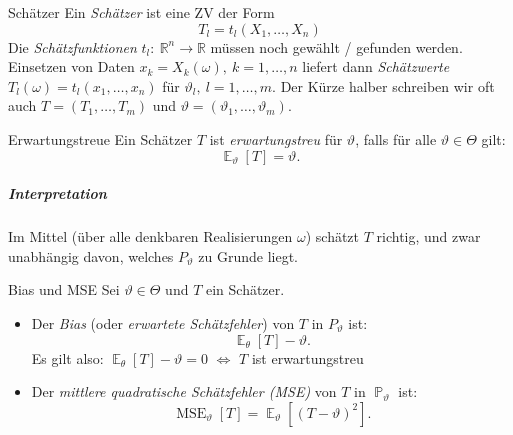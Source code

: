 \documentclass[a4paper,10pt]{article}
\def\R{\mathbb{R}}
\renewcommand{\P}{\operatorname{\mathbb{P}}}
\DeclareMathOperator{\E}{\mathbb{E}}
\DeclareMathOperator{\mse}{MSE}
\numberwithin{equation}{section}
\begin{document}
\begin{mainbox}{Schätzer}
    Ein \emph{Schätzer} ist eine ZV der Form
    \[
        T_l = t_l(X_1, \dots, X_n)
    \]
    Die \emph{Schätzfunktionen} \( t_l: \: \R^n \to \R \) müssen noch gewählt / gefunden werden.
    Einsetzen von Daten \( x_k = X_k(\omega), \ k = 1, \dots, n \) liefert dann \emph{Schätzwerte} \( T_l(\omega) = t_l(x_1, \dots, x_n) \) für \( \vartheta_l, \ l = 1, \dots, m \).
    Der Kürze halber schreiben wir oft auch \( T = (T_1, \dots, T_m) \) und \( \vartheta = (\vartheta_1, \dots, \vartheta_m) \).
\end{mainbox}


\begin{mainbox}{Erwartungstreue}
    Ein Schätzer \( T \) ist \emph{erwartungstreu} für \( \vartheta \), falls für alle \( \vartheta \in \Theta \) gilt:
    \[
        \E_\vartheta[T] = \vartheta \text{.}
    \]
\end{mainbox}
\subparagraph{Interpretation} Im Mittel (über alle denkbaren Realisierungen \( \omega \)) schätzt \( T \) richtig, und zwar unabhängig davon, welches \( P_\vartheta \) zu Grunde liegt.

\begin{mainbox}{Bias und MSE}
    Sei \( \vartheta \in \Theta \) und \( T \) ein Schätzer.
    \begin{itemize}
        \item Der \emph{Bias} (oder \emph{erwartete Schätzfehler}) von \( T \) in \( P_\vartheta \) ist:
        \[
            \E_\theta[T] - \vartheta \text{.}
        \]
        Es gilt also: \( \E_\theta[T] - \vartheta = 0 \) \( \iff \) \( T \) ist erwartungstreu
        \item Der \emph{mittlere quadratische Schätzfehler (MSE)} von \( T \) in \( \P_\vartheta \) ist:
        \[
            \mse_\vartheta[T] = \E_\vartheta[(T - \vartheta)^2] \text{.}
        \]
    \end{itemize}
\end{mainbox}
\end{document}
